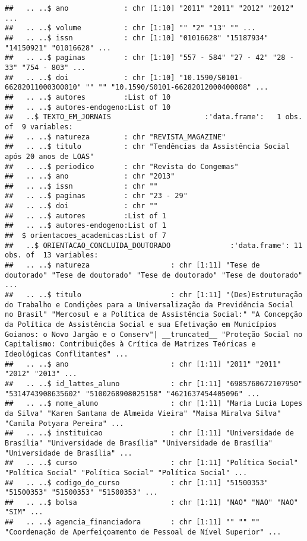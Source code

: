\documentclass[]{article}
\begin{document}
\begin{verbatim}
##   .. ..$ ano             : chr [1:10] "2011" "2011" "2012" "2012" ...
##   .. ..$ volume          : chr [1:10] "" "2" "13" "" ...
##   .. ..$ issn            : chr [1:10] "01016628" "15187934" "14150921" "01016628" ...
##   .. ..$ paginas         : chr [1:10] "557 - 584" "27 - 42" "28 - 33" "754 - 803" ...
##   .. ..$ doi             : chr [1:10] "10.1590/S0101-66282011000300010" "" "" "10.1590/S0101-66282012000400008" ...
##   .. ..$ autores         :List of 10
##   .. ..$ autores-endogeno:List of 10
##   ..$ TEXTO_EM_JORNAIS                      :'data.frame':   1 obs. of  9 variables:
##   .. ..$ natureza        : chr "REVISTA_MAGAZINE"
##   .. ..$ titulo          : chr "Tendências da Assistência Social após 20 anos de LOAS"
##   .. ..$ periodico       : chr "Revista do Congemas"
##   .. ..$ ano             : chr "2013"
##   .. ..$ issn            : chr ""
##   .. ..$ paginas         : chr "23 - 29"
##   .. ..$ doi             : chr ""
##   .. ..$ autores         :List of 1
##   .. ..$ autores-endogeno:List of 1
##  $ orientacoes_academicas:List of 7
##   ..$ ORIENTACAO_CONCLUIDA_DOUTORADO              :'data.frame': 11 obs. of  13 variables:
##   .. ..$ natureza                   : chr [1:11] "Tese de doutorado" "Tese de doutorado" "Tese de doutorado" "Tese de doutorado" ...
##   .. ..$ titulo                     : chr [1:11] "(Des)Estruturação do Trabalho e Condições para a Universalização da Previdência Social no Brasil" "Mercosul e a Política de Assistência Social:" "A Concepção da Política de Assistência Social e sua Efetivação em Municípios Goianos: o Novo Jargão e o Conserv"| __truncated__ "Proteção Social no Capitalismo: Contribuições à Crítica de Matrizes Teóricas e Ideológicas Conflitantes" ...
##   .. ..$ ano                        : chr [1:11] "2011" "2011" "2012" "2013" ...
##   .. ..$ id_lattes_aluno            : chr [1:11] "6985760672107950" "5314743908635602" "5100268908025158" "4621637454405096" ...
##   .. ..$ nome_aluno                 : chr [1:11] "Maria Lucia Lopes da Silva" "Karen Santana de Almeida Vieira" "Maisa Miralva Silva" "Camila Potyara Pereira" ...
##   .. ..$ instituicao                : chr [1:11] "Universidade de Brasília" "Universidade de Brasília" "Universidade de Brasília" "Universidade de Brasília" ...
##   .. ..$ curso                      : chr [1:11] "Política Social" "Política Social" "Política Social" "Política Social" ...
##   .. ..$ codigo_do_curso            : chr [1:11] "51500353" "51500353" "51500353" "51500353" ...
##   .. ..$ bolsa                      : chr [1:11] "NAO" "NAO" "NAO" "SIM" ...
##   .. ..$ agencia_financiadora       : chr [1:11] "" "" "" "Coordenação de Aperfeiçoamento de Pessoal de Nível Superior" ...

\end{verbatim}
\end{document}
